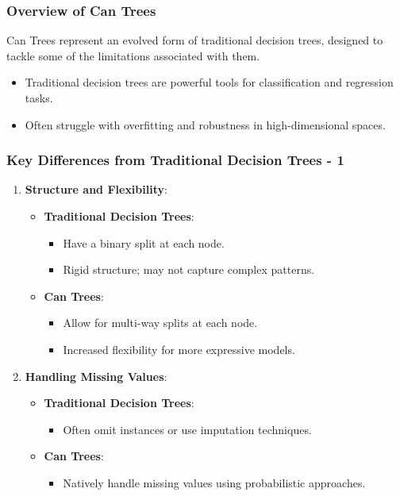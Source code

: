 \documentclass[aspectratio=169]{beamer}
\begin{document}
\begin{frame}[fragile]
    \titlepage
\end{frame}

\begin{frame}[fragile]
    \frametitle{Overview of Can Trees}
    Can Trees represent an evolved form of traditional decision trees, designed to tackle some of the limitations associated with them. 
    \begin{itemize}
        \item Traditional decision trees are powerful tools for classification and regression tasks.
        \item Often struggle with overfitting and robustness in high-dimensional spaces.
    \end{itemize}
\end{frame}

\begin{frame}[fragile]
    \frametitle{Key Differences from Traditional Decision Trees - 1}
    \begin{enumerate}
        \item \textbf{Structure and Flexibility}:
            \begin{itemize}
                \item \textbf{Traditional Decision Trees}: 
                    \begin{itemize}
                        \item Have a binary split at each node.
                        \item Rigid structure; may not capture complex patterns.
                    \end{itemize}
                \item \textbf{Can Trees}:
                    \begin{itemize}
                        \item Allow for multi-way splits at each node.
                        \item Increased flexibility for more expressive models.
                    \end{itemize}
            \end{itemize}
        \item \textbf{Handling Missing Values}:
            \begin{itemize}
                \item \textbf{Traditional Decision Trees}:
                    \begin{itemize}
                        \item Often omit instances or use imputation techniques.
                    \end{itemize}
                \item \textbf{Can Trees}:
                    \begin{itemize}
                        \item Natively handle missing values using probabilistic approaches.
                    \end{itemize}
            \end{itemize}
    \end{enumerate}
\end{frame}
\end{document}
